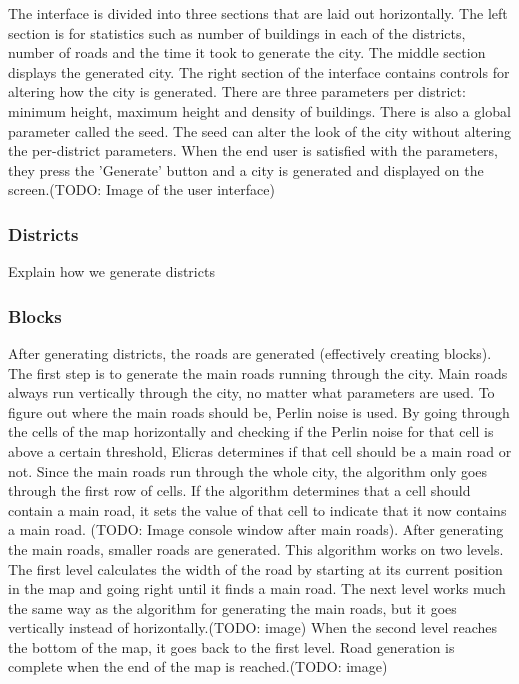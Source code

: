 		\par
		The interface is divided into three sections that are laid out horizontally. The left section is for statistics such as number of buildings in each of the districts, number of roads and the time it took to generate the city. The middle section displays the generated city. The right section of the interface contains controls for altering how the city is generated. There are three parameters per district: minimum height, maximum height and density of buildings. There is also a global parameter called the seed. The seed can alter the look of the city without altering the per-district parameters. When the end user is satisfied with the parameters, they press the 'Generate' button and a city is generated and displayed on the screen.(TODO: Image of the user interface)
		
		\subsubsection{Districts}
		Explain how we generate districts
		
		\subsubsection{Blocks}
		After generating districts, the roads are generated (effectively creating blocks). The first step is to generate the main roads running through the city. Main roads always run vertically through the city, no matter what parameters are used. To figure out where the main roads should be, Perlin noise is used. By going through the cells of the map horizontally and checking if the Perlin noise for that cell is above a certain threshold, Elicras determines if that cell should be a main road or not. Since the main roads run through the whole city, the algorithm only goes through the first row of cells. If the algorithm determines that a cell should contain a main road, it sets the value of that cell to indicate that it now contains a main road. (TODO: Image console window after main roads). After generating the main roads, smaller roads are generated. This algorithm works on two levels. The first level calculates the width of the road by starting at its current position in the map and going right until it finds a main road. The next level works much the same way as the algorithm for generating the main roads, but it goes vertically instead of horizontally.(TODO: image) When the second level reaches the bottom of the map, it goes back to the first level. Road generation is complete when the end of the map is reached.(TODO: image)
		

